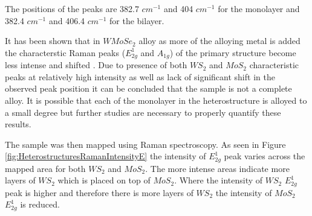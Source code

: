 The positions of the peaks are 382.7 $cm^{-1}$ and 404 $cm^{-1}$ for the monolayer and 382.4 $cm^{-1}$ and 406.4 $cm^{-1}$ for the bilayer. 

It has been shown that in $WMoSe_2$ alloy as more of the alloying metal is added the characterstic Raman peaks ($E^1_{2g}$ and $A_{1g}$) of the primary structure become less intense and shifted \cite{Zhang2014}. Due to presence of both $WS_2$ and $MoS_2$ characteristic peaks at relatively high intensity as well as lack of significant shift in the observed peak position it can be concluded that the sample is not a complete alloy. It is possible that each of the monolayer in the heterostructure is alloyed to a small degree but further studies are necessary to properly quantify these results.

The sample was then mapped using Raman spectroscopy. As seen in Figure \ref{fig:HeterostructuresRamanIntensityE} the intensity of $E^1_{2g}$ peak varies across the mapped area for both $WS_2$ and $MoS_2$. The more intense areas indicate more layers of $WS_2$ which is placed on top of $MoS_2$. Where the intensity of $WS_2$ $E^1_{2g}$ peak is higher and therefore there is more layers of $WS_2$ the intensity of $MoS_2$ $E^1_{2g}$ is reduced. 

